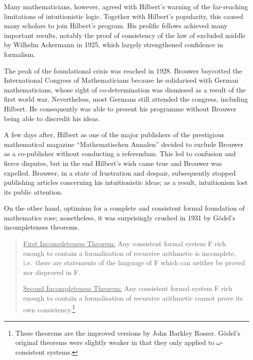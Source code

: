 \documentclass[hidelinks]{article}
\begin{document}
Many mathematicians, however, agreed with Hilbert's warning of the far-reaching limitations of intuitionistic logic. Together with Hilbert's popularity, this caused many scholars to join Hilbert's program. His prolific fellows achieved many important results, notably the proof of consistency of the law of excluded middle by Wilhelm Ackermann in 1925, which largely strengthened confidence in formalism.

The peak of the foundational crisis was reached in 1928. Brouwer boycotted the International Congress of Mathematicians because he solidarised with German mathematicians, whose right of co-determination was dismissed as a result of the first world war. Nevertheless, most Germans still attended the congress, including Hilbert. He consequently was able to present his programme without Brouwer being able to discredit his ideas.

A few days after, Hilbert as one of the major publishers of the prestigious mathematical magazine ``Mathematischen Annalen'' decided to exclude Brouwer as a co-publisher without conducting a referendum. This led to confusion and fierce disputes, but in the end Hilbert's wish came true and Brouwer was expelled. Brouwer, in a state of frustration and despair, subsequently stopped publishing articles concerning his intuitionistic ideas; as a result, intuitionism lost its public attention.  

On the other hand, optimism for a complete and consistent formal foundation of mathematics rose; nonetheless, it was surprisingly crushed in 1931 by Gödel's incompleteness theorems.

\begin{quote}
\underline{First Incompleteness Theorem:} Any consistent formal system F rich enough to contain a formalisation of recursive arithmetic is incomplete, i.e.\ there are statements of the language of F which can neither be proved nor disproved in F.

\underline{Second Incompleteness Theorem:} Any consistent formal system F rich enough to contain a formalisation of recursive arithmetic cannot prove its own consistency.\footnote{These theorems are the improved versions by John Barkley Rosser. Gödel's original theorems were slightly weaker in that they only applied to $\omega$-consistent systems.\cite[pp.~293--320]{fraenkel_incompleteness}}
\end{quote}
\end{document}
